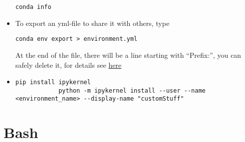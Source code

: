 \documentclass[12pt, a4paper]{article}
\numberwithin{equation}{section}
\theoremstyle{definition}
\theoremstyle{definition}
\begin{document}
\begin{itemize}
		\begin{lstlisting}[style=mystylebash, label=alg:conda_info, xleftmargin=\parindent]
			conda info
		\end{lstlisting}
	
		\item To export an yml-file to share it with others, type 
		
		\begin{lstlisting}[style=mystylebash, label=alg:conda_export, xleftmargin=\parindent]
			conda env export > environment.yml
		\end{lstlisting}
	
		At the end of the file, there will be a line starting with \enquote{Prefix:}, you can safely delete it, for details see \href{https://stackoverflow.com/questions/39280638/how-to-share-conda-environments-across-platforms}{here}
		
		\item 

		\begin{lstlisting}[style=mystylebash, label=alg:jbn_kernel, xleftmargin=\parindent]
			pip install ipykernel 
			python -m ipykernel install --user --name <environment_name> --display-name "customStuff"
		\end{lstlisting}
	
	\end{itemize}
	
	\newpage 
	
	\section{Bash}
	
\end{document}
